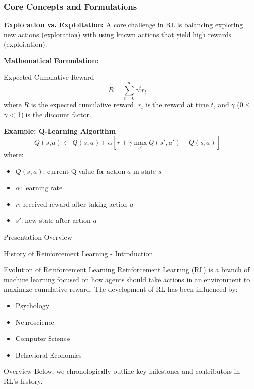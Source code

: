 \documentclass[aspectratio=169]{beamer}
\begin{document}
\begin{frame}[fragile]
    \frametitle{Core Concepts and Formulations}
    
    \textbf{Exploration vs. Exploitation:} A core challenge in RL is balancing exploring new actions (exploration) with using known actions that yield high rewards (exploitation).
    
    \textbf{Mathematical Formulation:}
    \begin{block}{Expected Cumulative Reward}
        \begin{equation}
        R = \sum_{t=0}^{\infty} \gamma^t r_t
        \end{equation}
        where $R$ is the expected cumulative reward, $r_t$ is the reward at time $t$, and $\gamma$ (0 ≤ $\gamma$ < 1) is the discount factor.
    \end{block}

    \textbf{Example: Q-Learning Algorithm}
    \begin{equation}
    Q(s, a) \gets Q(s, a) + \alpha \left[ r + \gamma \max_{a'} Q(s', a') - Q(s, a) \right]
    \end{equation}
    where:
    \begin{itemize}
        \item $Q(s, a)$: current Q-value for action $a$ in state $s$
        \item $\alpha$: learning rate
        \item $r$: received reward after taking action $a$
        \item $s'$: new state after action $a$
    \end{itemize}
\end{frame}

\begin{frame}[fragile]{Presentation Overview}
  \tableofcontents
\end{frame}

\begin{frame}[fragile]{History of Reinforcement Learning - Introduction}
  \begin{block}{Evolution of Reinforcement Learning}
    Reinforcement Learning (RL) is a branch of machine learning focused on how agents should take actions in an environment to maximize cumulative reward. The development of RL has been influenced by:
  \end{block}
  \begin{itemize}
    \item Psychology
    \item Neuroscience
    \item Computer Science
    \item Behavioral Economics
  \end{itemize}
  \begin{block}{Overview}
    Below, we chronologically outline key milestones and contributors in RL's history.
  \end{block}
\end{frame}
\end{document}
